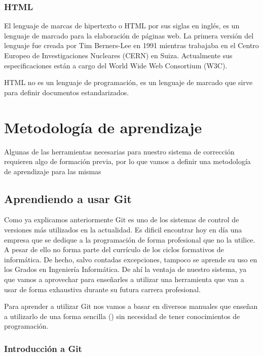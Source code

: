 \subsubsection{HTML}

El lenguaje de marcas de hipertexto o HTML por sus siglas en inglés, es un lenguaje de marcado para la elaboración de páginas web. La primera versión del lenguaje fue creada por Tim Berners-Lee en 1991 mientras trabajaba en el Centro Europeo de Investigaciones Nucleares (CERN) en Suiza. Actualmente sus especificaciones están a cargo del World Wide Web Consortium (W3C).

\bigskip
HTML no es un lenguaje de programación, es un lenguaje de marcado que sirve para definir documentos estandarizados.

\section{Metodología de aprendizaje}

Algunas de las herramientas necesarias para nuestro sistema de corrección requieren algo de formación previa, por lo que vamos a definir una metodología de aprendizaje para las mismas

\subsection{Aprendiendo a usar Git}

Como ya explicamos anteriormente Git es uno de los sistemas de control de versiones más utilizados en la actualidad. Es dificil encontrar hoy en día una empresa que se dedique a la programación de forma profesional que no la utilice. A pesar de ello no forma parte del currículo de los ciclos formativos de informática. De hecho, salvo contadas excepciones, tampoco se aprende su uso en los Grados en Ingeniería Informática. De ahí la ventaja de nuestro sistema, ya que vamos a aprovechar para enseñarles a utilizar una herramienta que van a usar de forma exhaustiva durante su futura carrera profesional.

\bigskip
Para aprender a utilizar Git nos vamos a basar en diversos manuales que enseñan a utilizarlo de una forma sencilla (\cite{popov_control_2012}) sin necesidad de tener conocimientos de programación.

\subsubsection{Introducción a Git}

